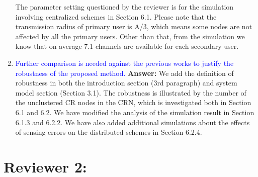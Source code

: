 \documentclass[10pt,a4paper]{article}
\begin{document}
\begin{enumerate}
The parameter setting questioned by the reviewer is for the simulation involving centralized schemes in Section 6.1.
    Please note that the transmission radius of primary user is A/3, which means some nodes are not affected by all the primary users.
    Other than that, from the simulation we know that on average 7.1 channels are available for each secondary user.
    
\item \textcolor{blue}{ Further comparison is needed against the previous works to justify the robustness of the proposed method.}
\textbf{Answer:} 	We add the definition of robustness in both the introduction section (3rd paragraph) and system model section (Section 3.1).
The robustness is illustrated by the number of the unclustered CR nodes in the CRN, which is investigated both in Section 6.1 and 6.2.
We have modified the analysis of the simulation result in Section 6.1.3 and 6.2.2.
We have also added additional simulations about the effects of sensing errors on the distributed schemes in Section 6.2.4.

\end{enumerate}

\section{Reviewer 2:}
\end{document}

